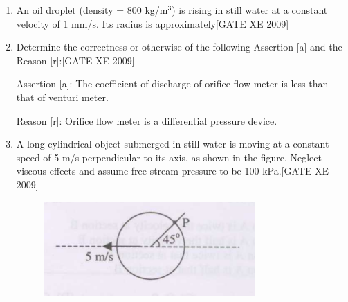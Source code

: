 \documentclass[journal,12pt,onecolumn]{IEEEtran}
\theoremstyle{remark}
\begin{document}
\begin{enumerate}
\item An oil droplet (density = 800 kg/m$^3$) is rising in still water at a constant velocity of 1 mm/s. Its radius is approximately\hfill[GATE XE 2009]

\begin{enumerate}
\end{enumerate}



\item Determine the correctness or otherwise of the following Assertion [a] and the Reason [r]:\hfill[GATE XE 2009]

Assertion [a]: The coefficient of discharge of orifice flow meter is less than that of venturi meter.

Reason [r]: Orifice flow meter is a differential pressure device.

\begin{enumerate}
\end{enumerate}




\item A long cylindrical object submerged in still water is moving at a constant speed of 5 m/s perpendicular to its axis, as shown in the figure. Neglect viscous effects and assume free stream pressure to be 100 kPa.\hfill[GATE XE 2009]
  
  \begin{figure}[H]
      \centering
      \includegraphics[width=0.5\linewidth]{figs/fig4.png}
      \caption*{}
      \label{fig:Q 31}
  \end{figure}
    





\end{enumerate}
\end{document}
